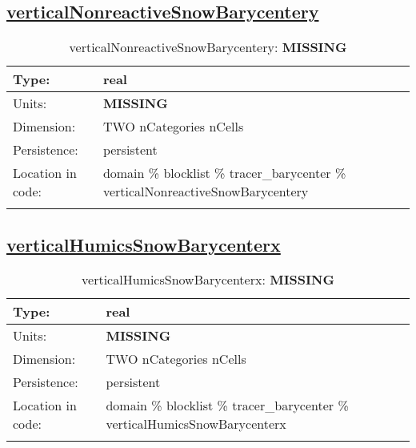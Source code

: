 \subsection[verticalNonreactiveSnowBarycentery]{\hyperref[sec:var_tab_tracer_barycenter]{verticalNonreactiveSnowBarycentery}}
\label{subsec:var_sec_tracer_barycenter_verticalNonreactiveSnowBarycentery}
\begin{center}
\begin{longtable}{| p{2.0in} | p{4.0in} |}
        \hline 
        Type: & real \\
        \hline 
        Units: & {\bf \color{red} MISSING} \\
        \hline 
        Dimension: & TWO nCategories nCells \\
        \hline 
        Persistence: & persistent \\
        \hline 
         Location in code: & domain \% blocklist \% tracer\_barycenter \% verticalNonreactiveSnowBarycentery \\
         \hline 
    \caption{verticalNonreactiveSnowBarycentery: {\bf \color{red} MISSING}}
\end{longtable}
\end{center}
\subsection[verticalHumicsSnowBarycenterx]{\hyperref[sec:var_tab_tracer_barycenter]{verticalHumicsSnowBarycenterx}}
\label{subsec:var_sec_tracer_barycenter_verticalHumicsSnowBarycenterx}
\begin{center}
\begin{longtable}{| p{2.0in} | p{4.0in} |}
        \hline 
        Type: & real \\
        \hline 
        Units: & {\bf \color{red} MISSING} \\
        \hline 
        Dimension: & TWO nCategories nCells \\
        \hline 
        Persistence: & persistent \\
        \hline 
         Location in code: & domain \% blocklist \% tracer\_barycenter \% verticalHumicsSnowBarycenterx \\
         \hline 
    \caption{verticalHumicsSnowBarycenterx: {\bf \color{red} MISSING}}
\end{longtable}
\end{center}
